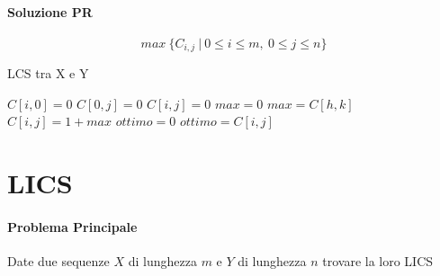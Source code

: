\documentclass[12pt]{article}
\begin{document}
\paragraph{Soluzione PR}
$$max \ \{C_{i,j} \ | \ 0 \leq i \leq m, \ 0 \leq j \leq n\}$$
\newpage
\begin{algorithm}
    \caption{LCS tra X e Y}
    \begin{algorithmic}
        \STATE $C[i, 0]=0$
        \ENDFOR
        \STATE $C[0, j]=0$
        \ENDFOR
        \STATE $C[i,j]=0$
        \ENDIF
        \STATE $max=0$
        \STATE $max = C[h,k]$
        \ENDIF
        \ENDFOR
        \ENDFOR
        \STATE $C[i,j]=1+max$
        \ENDIF
        \ENDFOR
        \ENDFOR
        \STATE $ottimo=0$
        \STATE $ottimo = C[i,j]$
        \ENDIF
        \ENDFOR
        \ENDFOR
    \end{algorithmic}
\end{algorithm}
\newpage

\section{LICS}
\paragraph{Problema Principale}
Date due sequenze $X$ di lunghezza $m$ e $Y$ di lunghezza $n$ trovare la loro LICS
\end{document}
